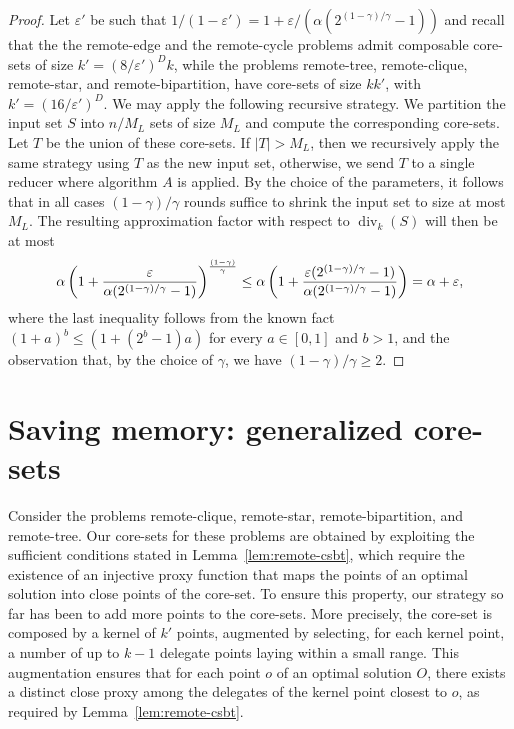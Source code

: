 \documentclass{article}
\DeclareMathOperator{\diversity}{div}
\renewcommand{\epsilon}{\varepsilon}
\begin{document}
\begin{proof}
  Let $\epsilon'$ be such that
  $1/(1-\epsilon') = 1+ \epsilon / (\alpha( 2^{(1-\gamma)/\gamma}
  -1))$ and recall that the the remote-edge and the remote-cycle
  problems admit composable core-sets of size $k'=(8/\epsilon')^Dk$,
  while the problems remote-tree, remote-clique, remote-star, and remote-bipartition,
  have core-sets of size $kk'$, with
  $k'=(16/\epsilon')^D$. We may apply the following recursive
  strategy. We partition the input set $S$ into $n/M_L$ sets of size
  $M_L$ and compute the corresponding core-sets. Let $T$ be the union
  of these core-sets. If $|T| > M_L$, then we recursively apply the
  same strategy using $T$ as the new input set, otherwise, we send $T$
  to a single reducer where algorithm $A$ is applied. By the choice of
  the parameters, it follows that in all cases $(1-\gamma)/\gamma$
  rounds suffice to shrink the input set to size at most $M_L$. The
  resulting approximation factor with respect to $\diversity_k(S)$
  will then be at most
  \[
    \begin{aligned}
      \alpha \left(
        1+{\epsilon \over \alpha (2^{(1-\gamma)/\gamma} -1)}
      \right)^{\frac{(1-\gamma)}{\gamma}}
      \le 
      \alpha \left(1+ 
        \frac
        {\epsilon (2^{(1-\gamma)/\gamma} -1)}
        {\alpha (2^{(1-\gamma)/\gamma} -1)} \right)
      = \alpha + \epsilon,
    \end{aligned}
  \] 
  where the last inequality follows from the known fact
  $(1+a)^b \leq (1+(2^b-1)a)$ for every $a \in [0,1]$ and $b > 1$, and
  the observation that, by the choice of $\gamma$, we have
  $(1-\gamma)/\gamma \geq 2$.
\end{proof}


\section{Saving memory: generalized \mbox{core-sets}} \label{sec:generalized}

Consider the problems remote-clique, remote-star, remote-bipartition,
and remote-tree. Our core-sets for these problems are obtained by
exploiting the sufficient conditions stated in
Lemma~\ref{lem:remote-csbt}, which require the existence of an
injective proxy function that maps the points of an optimal solution
into close points of the core-set.  To ensure this property, our
strategy so far has been to add more points to the core-sets.  More
precisely, the core-set is composed by a kernel of $k'$ points,
augmented by selecting, for each kernel point, a number of up to $k-1$
delegate points laying within a small range.  This augmentation
ensures that for each point $o$ of an optimal solution $O$, there
exists a distinct close proxy among the delegates of the kernel point
closest to $o$, as required by Lemma~\ref{lem:remote-csbt}.
\end{document}
